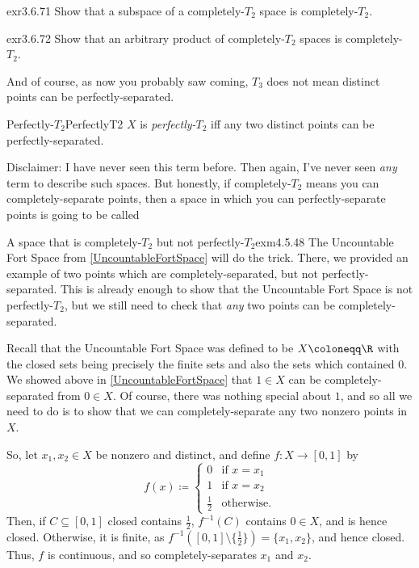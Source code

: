 \begin{exr}{}{exr3.6.71}
Show that a subspace of a completely-$T_2$ space is completely-$T_2$.
\end{exr}
\begin{exr}{}{exr3.6.72}
Show that an arbitrary product of completely-$T_2$ spaces is completely-$T_2$.
\end{exr}

And of course, as now you probably saw coming, $T_3$ does not mean distinct points can be perfectly-separated.
\begin{dfn}{Perfectly-$T_2$}{PerfectlyT2}
$X$ is \emph{perfectly-$T_2$} iff any two distinct points can be perfectly-separated.
\begin{rmk}
Disclaimer:  I have never seen this term before.  Then again, I've never seen \emph{any} term to describe such spaces.  But honestly, if completely-$T_2$ means you can completely-separate points, then a space in which you can perfectly-separate points is going to be called \textellipsis
\end{rmk}
\end{dfn}
\begin{exm}{A space that is completely-$T_2$ but not perfectly-$T_2$}{exm4.5.48}
The Uncountable Fort Space from \cref{UncountableFortSpace} will do the trick.  There, we provided an example of two points which are completely-separated, but not perfectly-separated.  This is already enough to show that the Uncountable Fort Space is not perfectly-$T_2$, but we still need to check that \emph{any} two points can be completely-separated.

Recall that the Uncountable Fort Space was defined to be $X\coloneqq \R$ with the closed sets being precisely the finite sets and also the sets which contained $0$.  We showed above in \cref{UncountableFortSpace} that $1\in X$ can be completely-separated from $0\in X$.  Of course, there was nothing special about $1$, and so all we need to do is to show that we can completely-separate any two nonzero points in $X$.

So, let $x_1,x_2\in X$ be nonzero and distinct, and define $f\colon X\rightarrow [0,1]$ by
\begin{equation}
f(x)\coloneqq \begin{cases}0 & \text{if }x=x_1 \\ 1 & \text{if }x=x_2 \\ \tfrac{1}{2} & \text{otherwise.}\end{cases}
\end{equation}
Then, if $C\subseteq [0,1]$ closed contains $\frac{1}{2}$, $f^{-1}(C)$ contains $0\in X$, and is hence closed.  Otherwise, it is finite, as $f^{-1}\left( [0,1]\setminus \{ \frac{1}{2}\} \right) =\{ x_1,x_2\}$, and hence closed.  Thus, $f$ is continuous, and so completely-separates $x_1$ and $x_2$.
\end{exm}
